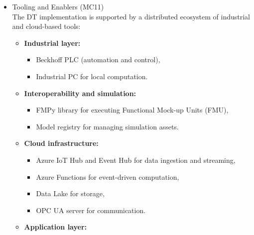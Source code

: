 \documentclass[
]{article}
\providecommand{\tightlist}{%
  \setlength{\itemsep}{0pt}\setlength{\parskip}{0pt}}
\begin{document}
\begin{itemize}
\begin{itemize}
\begin{itemize}
\begin{itemize}
\begin{itemize}
          \begin{itemize}
          \tightlist
          \item
            sampled control vectors (e.g., valve opening, pump speed),
          \item
            perturbed parameter sets of the simulation model (loss
            pressur in certain pipes),
          \item
            corresponding simulated process variables.
          \end{itemize}
        \end{itemize}
      \item
        Tooling and Enablers (MC11)\\
        The DT implementation is supported by a distributed ecosystem of
        industrial and cloud-based tools:

        \begin{itemize}
        \item
          \textbf{Industrial layer:}

          \begin{itemize}
          \tightlist
          \item
            Beckhoff PLC (automation and control),
          \item
            Industrial PC for local computation.
          \end{itemize}
        \item
          \textbf{Interoperability and simulation:}

          \begin{itemize}
          \tightlist
          \item
            FMPy library for executing Functional Mock-up Units (FMU),
          \item
            Model registry for managing simulation assets.
          \end{itemize}
        \item
          \textbf{Cloud infrastructure:}

          \begin{itemize}
          \tightlist
          \item
            Azure IoT Hub and Event Hub for data ingestion and
            streaming,
          \item
            Azure Functions for event-driven computation,
          \item
            Data Lake for storage,
          \item
            OPC UA server for communication.
          \end{itemize}
        \item
          \textbf{Application layer:}


\end{itemize}
\end{itemize}
\end{itemize}
\end{itemize}
\end{itemize}
\end{document}
